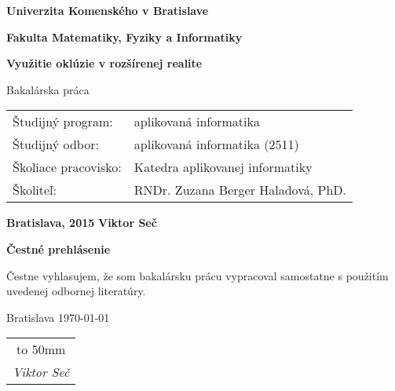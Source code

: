 \thispagestyle{empty}
\onehalfspacing

{\Large
\centerline{\textbf{Univerzita Komenského v Bratislave}}
\centerline{\textbf{Fakulta Matematiky, Fyziky a Informatiky}}
}

\vfil
{}
  \begin{center}
    {\LARGE \textbf{Využitie oklúzie v rozšírenej realite}}
    
    \bigskip
    \bigskip

    {\Large Bakalárska práca}\\
  \end{center}
  \vfil

\noindent
\begin{tabular}[B]{ll}
Študijný program: & aplikovaná informatika \\
Študijný odbor: & aplikovaná informatika (2511) \\
Školiace pracovisko: & Katedra aplikovanej informatiky \\
Školiteľ:  & RNDr. Zuzana Berger Haladová, PhD. \\
\end{tabular}

\bigskip

\noindent
\textbf{Bratislava, 2015} \hfill \textbf{Viktor Seč} 	
\pagebreak



\iftrue
	\thispagestyle{empty}

	\vfil

	\noindent\textbf{Čestné prehlásenie}

	\bigskip
	\begin{flushleft}
	Čestne vyhlasujem, že som bakalársku prácu vypracoval samostatne s použitím uvedenej odbornej literatúry.
	\end{flushleft}
	\bigskip

	\noindent Bratislava \today \hfil
	\begin{tabular}[t]{c}
	\hbox to 50mm {\dotfill} \\ \textit{\small Viktor Seč}
	\end{tabular} \qquad \linebreak

	\pagebreak
\fi



